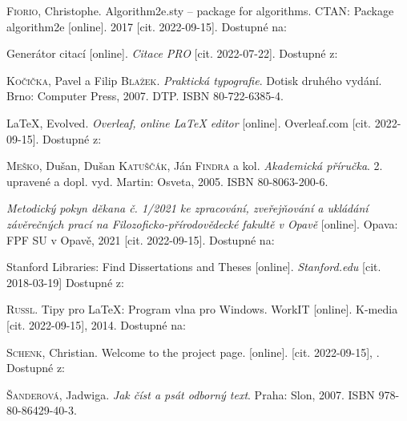 \begin{thebibliography}{99}
\textsc{Fiorio}, Christophe. Algorithm2e.sty -- package for algorithms. CTAN: Package algorithm2e [online]. 2017 [cit. 2022-09-15]. Dostupné na: 

Generátor citací [online]. \emph{Citace PRO} [cit. 2022-07-22]. Dostupné z: 

\textsc{Kočička}, Pavel a Filip \textsc{Blažek}. \emph{Praktická typografie}. Dotisk druhého vydání. Brno: Computer Press, 2007. DTP. ISBN 80-722-6385-4.


\LaTeX, Evolved. \emph{Overleaf, online \LaTeX{} editor} [online]. Overleaf.com [cit. 2022-09-15]. Dostupné z: 


\textsc{Meško}, Dušan, Dušan \textsc{Katuščák}, Ján \textsc{Findra} a kol. \emph{Akademická příručka}. 2. upravené a dopl. vyd. Martin: Osveta, 2005. ISBN 80-8063-200-6.

\emph{Metodický pokyn děkana č. 1/2021 ke zpracování, zveřejňování a ukládání závěrečných prací na Filozoficko-přírodovědecké fakultě v Opavě} [online]. Opava: FPF SU v Opavě, 2021 [cit. 2022-09-15]. Dostupné na: 

Stanford Libraries: Find Dissertations and Theses [online]. \emph{Stanford.edu} [cit. 2018-03-19] Dostupné z: 


\textsc{Russl}. Tipy pro LaTeX: Program vlna pro Windows. WorkIT [online]. K-media [cit. 2022-09-15], 2014. Dostupné na:

\textsc{Schenk}, Christian. Welcome to the \MikTeX{} project page. \MikTeX{} [online]. [cit. 2022-09-15], . Dostupné z: 

\textsc{Šanderová}, Jadwiga. \emph{Jak číst a psát odborný text}. Praha: Slon, 2007. ISBN 978-80-86429-40-3.



\end{thebibliography}




